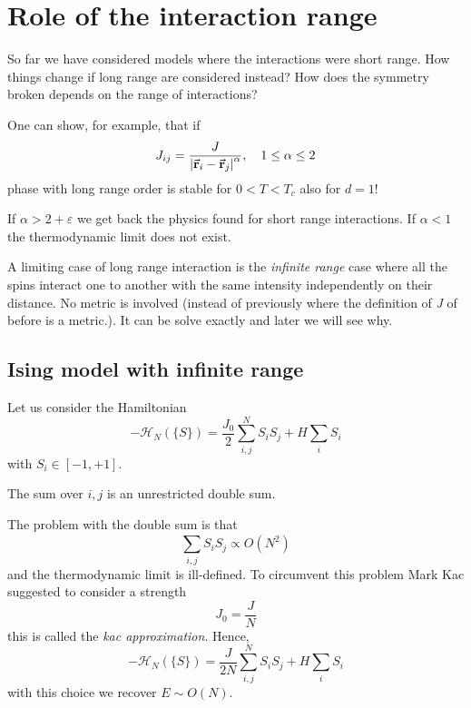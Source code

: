 \documentclass[../main/main.tex]{subfiles}
\begin{document}
\section{Role of the interaction range}
So far we have considered models where the interactions were short range. How things change if long range are considered instead? How does the symmetry broken depends on the range of interactions?

One can show, for example, that if
\begin{equation}
  J_{ij} = \frac{J}{\abs{\va{r}_i - \va{r}_j}^\alpha  }, \quad 1 \le \alpha \le 2
\end{equation}
phase with long range order is stable for \( 0 < T < T_c \) also for \( d=1 \)!  

\begin{remark}
If \( \alpha > 2 + \varepsilon  \) we get back the physics found for short range interactions. If \( \alpha <1 \) the thermodynamic limit does not exist.
\end{remark}

A limiting case of long range interaction is the \emph{infinite range} case where all the spins interact one to another with the same intensity independently on their distance. No metric is involved (instead of previously where the definition of \emph{J} of before is a metric.). It can be solve exactly and later we will see why.

\subsection{Ising model with infinite range}

Let us consider the Hamiltonian 
\begin{equation}
  -\mathcal{H}_N (\{ S \} ) = \frac{J_0}{2} \sum_{i,j}^{N} S_i S_j + H \sum_{i}^{}  S_i
\end{equation}
with \( S_i \in [-1,+1] \).
\begin{remark}
The sum over \(i,j\) is an unrestricted double sum.
\end{remark}
The problem with the double sum is that
\begin{equation*}
  \sum_{i,j}^{} S_i S_j \propto O(N^2)
\end{equation*}
and the thermodynamic limit is ill-defined. To circumvent this problem Mark Kac suggested to consider a strength
\begin{equation}
  J_0 = \frac{J}{N}
\end{equation}
this is called the \emph{kac approximation}. 
Hence,
\begin{equation}
  -\mathcal{H}_N (\{ S \} ) = \frac{J}{2N} \sum_{i,j}^{N} S_i S_j + H \sum_{i}^{}  S_i
\end{equation}
with this choice we recover \( E \sim O(N) \).  

\end{document}
